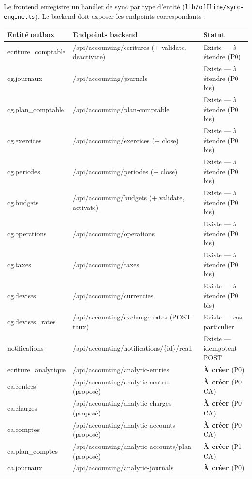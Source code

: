 \documentclass[12pt,a4paper]{report}
\begin{document}
Le frontend enregistre un handler de sync par type d'entité (\texttt{lib/offline/sync-engine.ts}). Le backend doit exposer les endpoints correspondants :

\begin{longtable}{@{}p{3.2cm}p{5.2cm}p{3.6cm}@{}}
\hline
\textbf{Entité outbox} & \textbf{Endpoints backend} & \textbf{Statut} \\
\hline
\endhead
ecriture\_comptable & /api/accounting/ecritures (+ validate, deactivate) & Existe --- à étendre (P0) \\
\hline
cg.journaux & /api/accounting/journals & Existe --- à étendre (P0 bis) \\
\hline
cg.plan\_comptable & /api/accounting/plan-comptable & Existe --- à étendre (P0 bis) \\
\hline
cg.exercices & /api/accounting/exercices (+ close) & Existe --- à étendre (P0 bis) \\
\hline
cg.periodes & /api/accounting/periodes (+ close) & Existe --- à étendre (P0 bis) \\
\hline
cg.budgets & /api/accounting/budgets (+ validate, activate) & Existe --- à étendre (P0 bis) \\
\hline
cg.operations & /api/accounting/operations & Existe --- à étendre (P0 bis) \\
\hline
cg.taxes & /api/accounting/taxes & Existe --- à étendre (P0 bis) \\
\hline
cg.devises & /api/accounting/currencies & Existe --- à étendre (P0 bis) \\
\hline
cg.devises\_rates & /api/accounting/exchange-rates (POST taux) & Existe --- cas particulier \\
\hline
notifications & /api/accounting/notifications/\{id\}/read & Existe --- idempotent POST \\
\hline
ecriture\_analytique & /api/accounting/analytic-entries & \textbf{À créer} (P0) \\
\hline
ca.centres & /api/accounting/analytic-centres (proposé) & \textbf{À créer} (P0 CA) \\
\hline
ca.charges & /api/accounting/analytic-charges (proposé) & \textbf{À créer} (P0 CA) \\
\hline
ca.comptes & /api/accounting/analytic-accounts (proposé) & \textbf{À créer} (P0 CA) \\
\hline
ca.plan\_comptes & /api/accounting/analytic-accounts/plan (proposé) & \textbf{À créer} (P1 CA) \\
\hline
ca.journaux & /api/accounting/analytic-journals & \textbf{À créer} (P0) \\
\hline
\end{longtable}
\end{document}
